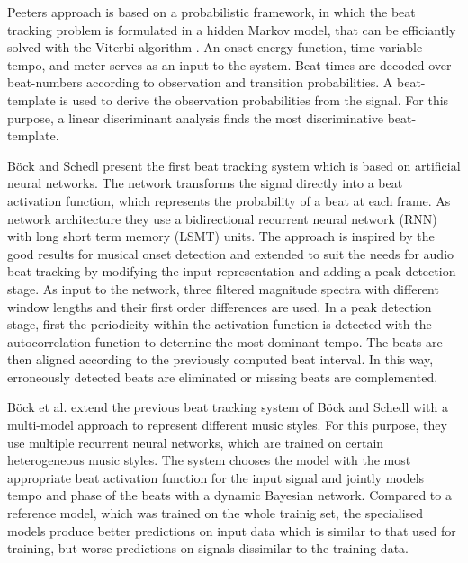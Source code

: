 \documentclass{scrartcl}
\begin{document}
Peeters \cite{Peeters2009} approach is based on a probabilistic framework, in which the beat tracking problem is formulated in a hidden Markov model, that can be efficiantly solved with the Viterbi algorithm \cite{Viterbi1967}. An onset-energy-function, time-variable tempo, and meter serves as an input to the system. Beat times are decoded over beat-numbers according to observation and transition probabilities. A beat-template is used to derive the observation probabilities from the signal. For this purpose, a linear discriminant analysis finds the most discriminative beat-template. 

Böck and Schedl \cite{Boeck2011} present the first beat tracking system which is based on artificial neural networks. The network transforms the signal directly into a beat activation function, which represents the probability of a beat at each frame.  As network architecture they use a bidirectional recurrent neural network (RNN) with long short term memory (LSMT) units. The approach is inspired by the good results for musical onset detection \cite{Eyben2010} and extended to suit the needs for audio beat tracking by modifying the input representation and adding a peak detection stage. As input to the network, three filtered magnitude spectra with different window lengths and their first order differences are used. In a peak detection stage, first the periodicity within the activation function is detected with the autocorrelation function to deternine the most dominant tempo. The beats are then aligned according to the previously computed beat interval. In this way, erroneously detected beats are eliminated or missing beats are complemented.

Böck et al. \cite{Boeck2014} extend the previous beat tracking system of Böck and Schedl with a multi-model approach to represent different music styles. For this purpose, they use multiple recurrent neural networks, which are trained on certain heterogeneous music styles. The system chooses the model with the most appropriate beat activation function for the input signal and jointly models tempo and phase of the beats with a dynamic Bayesian network. Compared to a reference model, which was trained on the whole trainig set, the specialised models produce better predictions on input data which is similar to that used for training, but worse predictions on signals dissimilar to the training data.
\end{document}
